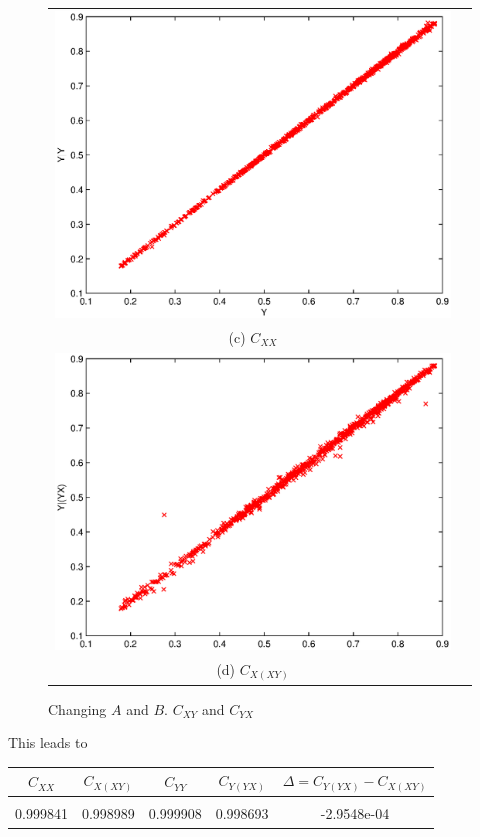 \documentclass{article}
\begin{document}
\begin{center}
\begin{figure}[H]
\begin{tabular}{cc}
\includegraphics[scale=0.5]{SugFig3_YgY.eps} \\
(c) $C_{XX}$ \\[6pt]
\includegraphics[scale=0.5]{SugFig3_YgYX.eps} \\
(d) $C_{X(XY)}$ \\[6pt]
\end{tabular}
\caption{Changing $A$ and $B$.  $C_{XY}$ and $C_{YX}$}
\label{fig1}
\end{figure}
\end{center}
This leads to

\begin{tabular}{c|c|c|c|c}
$C_{XX}$ & $C_{X(XY)}$ & $C_{YY}$ & $C_{Y(YX)}$ & $\Delta=C_{Y(YX)}-C_{X(XY)}$ \\
\hline \\
0.999841 & 0.998989 & 0.999908 & 0.998693 & -2.9548e-04
\end{tabular}
\end{document}
